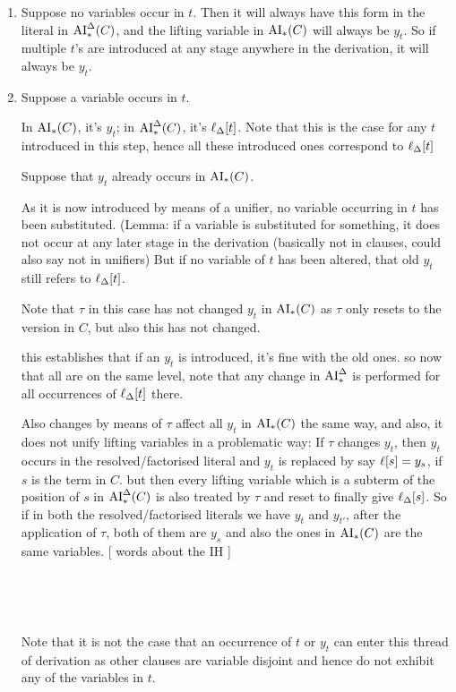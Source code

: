 \documentclass[,%
	paper=a4,%
	DIV11, %
	twoside=false,%
	liststotoc,
	bibtotoc,
	draft=false,%
	numbers=noendperiod
]{scrartcl}
\begin{document}
\begin{enumerate}
	\item Suppose no variables occur in $t$. Then it will always have this form in the literal in $\operatorname{AI}_\mathrm{*}^\Delta(C)$, and the lifting variable in $\operatorname{AI}_\mathrm{*}(C)$ will always be $y_t$. So if multiple $t$'s are introduced at any stage anywhere in the derivation, it will always be $y_t$.
	\item Suppose a variable occurs in $t$.

		In $\operatorname{AI}_\mathrm{*}(C)$, it's $y_t$; in $\operatorname{AI}_\mathrm{*}^\Delta(C)$, it's $\ell_{\Delta}[t]$.
		Note that this is the case for any $t$ introduced in this step, hence all these introduced ones correspond to $\ell_{\Delta}[t]$

		Suppose that $y_t$ already occurs in $\operatorname{AI}_\mathrm{*}(C)$.

		As it is now introduced by means of a unifier, no variable occurring in $t$ has been substituted. (Lemma: if a variable is substituted for something, it does not occur at any later stage in the derivation (basically not in clauses, could also say not in unifiers)
		But if no variable of $t$ has been altered, that old $y_t$ still refers to $\ell_{\Delta}[t]$.

		Note that $\tau$ in this case has not changed $y_t$ in $\operatorname{AI}_\mathrm{*}(C)$ as $\tau$ only resets to the version in $C$, but also this has not changed.

		this establishes that if an $y_t$ is introduced, it's fine with the old ones. 
		so now that all are on the same level, note that any change in $\operatorname{AI}_\mathrm{*}^\Delta$ is performed for all occurrences of $\ell_{\Delta}[t]$ there.

		Also changes by means of $\tau$ affect all $y_t$ in $\operatorname{AI}_\mathrm{*}(C)$ the same way, and also, it does not unify lifting variables in a problematic way:
		If $\tau$ changes $y_t$, then $y_t$ occurs in the resolved/factorised literal and $y_t$ is replaced by say $\ell[s] = y_s$, if $s$ is the term in $C$.
		but then every lifting variable which is a subterm of the position of $s$ in $\operatorname{AI}_\mathrm{*}^\Delta(C)$ is also treated by $\tau$ and reset to finally give $\ell_{\Delta}[s]$.
		So if in both the resolved/factorised literals we have $y_t$ and $y_{t'}$, after the application of $\tau$, both of them are $y_s$ and also the ones in $\operatorname{AI}_\mathrm{*}(C)$ are the same variables. 
		[ words about the IH ]




		
		
		~

		~

		Note that it is not the case that an occurrence of $t$ or $y_t$ can enter this thread of derivation as other clauses are variable disjoint and hence do not exhibit any of the variables in $t$.
\end{enumerate}
\end{document}
